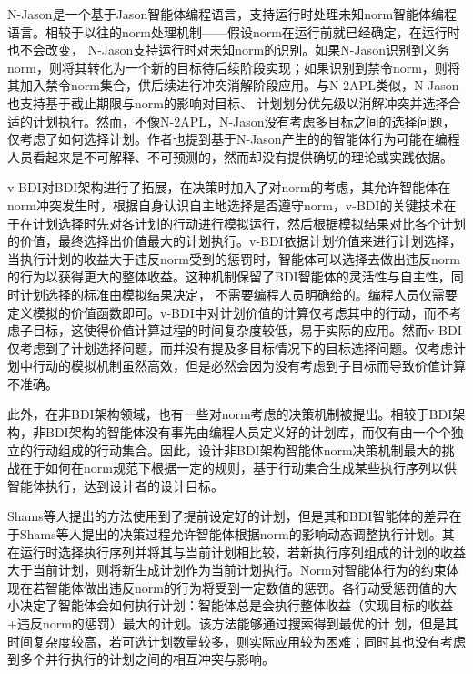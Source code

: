 N-Jason\cite{DBLP:conf/dalt/LeePLDA14}是一个基于Jason\cite{bordini2007programming}智能体编程语言，支持运行时处理未知norm智能体编程语言。相较于以往的norm处理机制——假设norm在运行前就已经确定，在运行时也不会改变， N-Jason支持运行时对未知norm的识别。如果N-Jason识别到义务norm，则将其转化为一个新的目标待后续阶段实现；如果识别到禁令norm，则将其加入禁令norm集合，供后续进行冲突消解阶段应用。与N-2APL类似，N-Jason 也支持基于截止期限与norm的影响对目标、 计划划分优先级以消解冲突并选择合适的计划执行。然而，不像N-2APL，N-Jason没有考虑多目标之间的选择问题，仅考虑了如何选择计划。作者也提到基于N-Jason产生的的智能体行为可能在编程人员看起来是不可解释、不可预测的，然而却没有提供确切的理论或实践依据。

v-BDI\cite{DBLP:journals/eaai/MeneguzziROVL15}对BDI架构进行了拓展，在决策时加入了对norm的考虑，其允许智能体在norm冲突发生时，根据自身认识自主地选择是否遵守norm，v-BDI的关键技术在于在计划选择时先对各计划的行动进行模拟运行，然后根据模拟结果对比各个计划的价值，最终选择出价值最大的计划执行。v-BDI依据计划价值来进行计划选择， 当执行计划的收益大于违反norm受到的惩罚时，智能体可以选择去做出违反norm的行为以获得更大的整体收益。这种机制保留了BDI智能体的灵活性与自主性，同时计划选择的标准由模拟结果决定， 不需要编程人员明确给的。编程人员仅需要定义模拟的价值函数即可。v-BDI中对计划价值的计算仅考虑其中的行动，而不考虑子目标，这使得价值计算过程的时间复杂度较低，易于实际的应用。然而v-BDI仅考虑到了计划选择问题，而并没有提及多目标情况下的目标选择问题。仅考虑计划中行动的模拟机制虽然高效，但是必然会因为没有考虑到子目标而导致价值计算不准确。

此外，在非BDI架构领域，也有一些对norm考虑的决策机制被提出。相较于BDI架构，非BDI架构的智能体没有事先由编程人员定义好的计划库，而仅有由一个个独立的行动组成的行动集合。因此，设计非BDI架构智能体norm决策机制最大的挑战在于如何在norm规范下根据一定的规则，基于行动集合生成某些执行序列以供智能体执行，达到设计者的设计目标。

%
Shams等人\cite{DBLP:conf/atal/ShamsVPV15}提出的方法使用到了提前设定好的计划，但是其和BDI智能体的差异在于Shams等人提出的决策过程允许智能体根据norm的影响动态调整执行计划。其在运行时选择执行序列并将其与当前计划相比较，若新执行序列组成的计划的收益大于当前计划，则将新生成计划作为当前计划执行。Norm对智能体行为的约束体现在若智能体做出违反norm的行为将受到一定数值的惩罚。各行动受惩罚值的大小决定了智能体会如何执行计划：智能体总是会执行整体收益（实现目标的收益+违反norm的惩罚）最大的计划。该方法能够通过搜索得到最优的计 划，但是其时间复杂度较高，若可选计划数量较多，则实际应用较为困难；同时其也没有考虑到多个并行执行的计划之间的相互冲突与影响。

